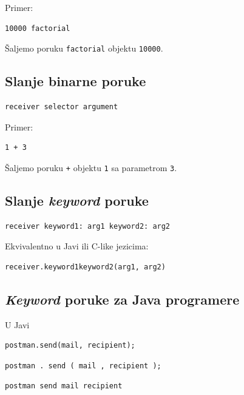 \documentclass[presentation]{beamer}
\begin{document}
Primer:

\begin{verbatim}
10000 factorial
\end{verbatim}


Šaljemo poruku \texttt{factorial} objektu \texttt{10000}.

\subsection{Slanje binarne poruke}
\label{sec:org60b66d3}

\begin{verbatim}
receiver selector argument
\end{verbatim}

Primer:

\begin{verbatim}
1 + 3
\end{verbatim}

Šaljemo poruku \texttt{+} objektu \texttt{1} sa parametrom \texttt{3}.

\subsection{Slanje \emph{keyword} poruke}
\label{sec:orgfdbcb87}

\begin{verbatim}
receiver keyword1: arg1 keyword2: arg2
\end{verbatim}

Ekvivalentno u Javi ili C-like jezicima:

\begin{verbatim}
receiver.keyword1keyword2(arg1, arg2)
\end{verbatim}

\subsection{\emph{Keyword} poruke za Java programere}
\label{sec:org71cee49}

U Javi

\begin{verbatim}
postman.send(mail, recipient);
\end{verbatim}

\begin{verbatim}
postman . send ( mail , recipient );
\end{verbatim}

\begin{verbatim}
postman send mail recipient
\end{verbatim}
\end{document}
